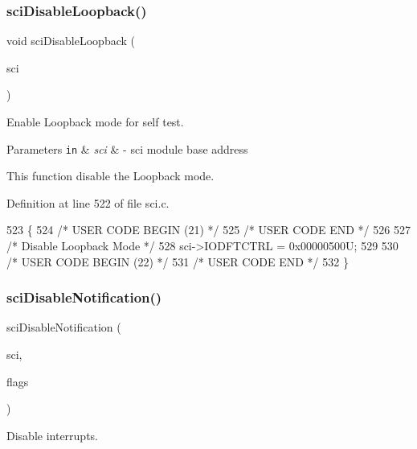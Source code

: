 \subsubsection{\texorpdfstring{sci\+Disable\+Loopback()}{sciDisableLoopback()}}
{\footnotesize\ttfamily void sci\+Disable\+Loopback (\begin{DoxyParamCaption}\item[{\mbox{\hyperlink{reg__sci_8h_ad5e2af74efb062728408d4ac1b7735db}{sci\+B\+A\+S\+E\+\_\+t}} $\ast$}]{sci }\end{DoxyParamCaption})}



Enable Loopback mode for self test. 


\begin{DoxyParams}[1]{Parameters}
\mbox{\tt in}  & {\em sci} & -\/ sci module base address\\
\hline
\end{DoxyParams}
This function disable the Loopback mode. 

Definition at line 522 of file sci.\+c.


\begin{DoxyCode}
523 \{
524 \textcolor{comment}{/* USER CODE BEGIN (21) */}
525 \textcolor{comment}{/* USER CODE END */}
526     
527     \textcolor{comment}{/* Disable Loopback Mode */}
528     sci->IODFTCTRL = 0x00000500U;
529     
530 \textcolor{comment}{/* USER CODE BEGIN (22) */}
531 \textcolor{comment}{/* USER CODE END */}
532 \}
\end{DoxyCode}
\mbox{\label{group__SCI_ga9f1a39a5272682dbd101ddcbbbdc8193}} 
\subsubsection{\texorpdfstring{sci\+Disable\+Notification()}{sciDisableNotification()}}
{\footnotesize\ttfamily sci\+Disable\+Notification (\begin{DoxyParamCaption}\item[{\mbox{\hyperlink{reg__sci_8h_ad5e2af74efb062728408d4ac1b7735db}{sci\+B\+A\+S\+E\+\_\+t}} $\ast$}]{sci,  }\item[{uint32}]{flags }\end{DoxyParamCaption})}



Disable interrupts. 


